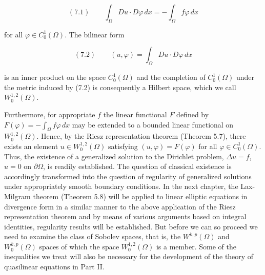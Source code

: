 \begin{equation}
(7.1)\qquad \int_{\Omega} Du \cdot D\varphi \, dx = - \int_{\Omega} f\varphi \, dx
\end{equation}

for all $\varphi \in C_0^1(\Omega)$. The bilinear form

\begin{equation}
(7.2)\qquad (u,\varphi) = \int_{\Omega} Du \cdot D\varphi \, dx
\end{equation}

is an inner product on the space $C_0^1(\Omega)$ and the completion of
$C_0^1(\Omega)$ under the metric induced by (7.2) is consequently a Hilbert
space, which we call $W_0^{1,2}(\Omega)$.

Furthermore, for appropriate $f$ the linear functional $F$ defined by
$F(\varphi) = - \int_{\Omega} f\varphi \, dx$
may be extended to a bounded linear functional on $W_0^{1,2}(\Omega)$. Hence, by
the Riesz representation theorem (Theorem 5.7), there exists an element
$u \in W_0^{1,2}(\Omega)$ satisfying $(u,\varphi) = F(\varphi)$ for all
$\varphi \in C_0^1(\Omega)$. Thus, the existence of a generalized solution to the
Dirichlet problem, $\Delta u = f$, $u = 0$ on $\partial \Omega$, is readily
established. The question of classical existence is accordingly transformed into
the question of regularity of generalized solutions under appropriately smooth
boundary conditions. In the next chapter, the Lax-Milgram theorem (Theorem 5.8)
will be applied to linear elliptic equations in divergence form in a similar
manner to the above application of the Riesz representation theorem and by means
of various arguments based on integral identities, regularity results will be
established. But before we can so proceed we need to examine the class of
Sobolev spaces, that is, the $W^{k,p}(\Omega)$ and $W_0^{k,p}(\Omega)$ spaces of
which the space $W_0^{1,2}(\Omega)$ is a member. Some of the inequalities we
treat will also be necessary for the development of the theory of quasilinear
equations in Part II.
